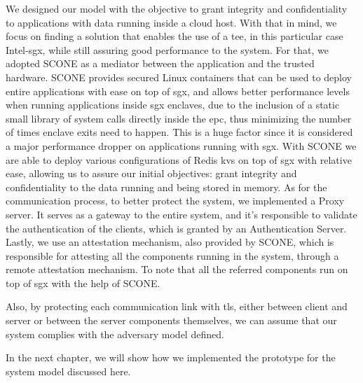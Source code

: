 We designed our model with the objective to grant integrity and confidentiality to applications with data running inside a cloud host. With that in mind, we focus on finding a solution that enables the use of a \gls{tee}, in this particular case Intel-\gls{sgx}, while still assuring good performance to the system. 
For that, we adopted SCONE as a mediator between the application and the trusted hardware. SCONE provides secured Linux containers that can be used to deploy entire applications with ease on top of \gls{sgx}, and allows better performance levels when running applications inside \gls{sgx} enclaves, due to the inclusion of a static small library of system calls directly inside the \gls{epc}, thus minimizing the number of times enclave exits need to happen. This is a huge factor since it is considered a major performance dropper on applications running with \gls{sgx}. 
With SCONE we are able to deploy various configurations of Redis \gls{kvs} on top of \gls{sgx} with relative ease, allowing us to assure our initial objectives:  grant integrity and confidentiality to the data running and being stored in memory. 
As for the communication process, to better protect the system, we implemented a Proxy server. It serves as a gateway to the entire system, and it's responsible to validate the authentication of the clients, which is granted by an Authentication Server. Lastly, we use an attestation mechanism, also provided by SCONE, which is responsible for attesting all the components running in the system, through a remote attestation mechanism. To note that all the referred components run on top of \gls{sgx} with the help of SCONE. 

Also, by protecting each communication link with \gls{tls}, either between client and server or between the server components themselves, we can assume that our system complies with the adversary model defined.

In the next chapter, we will show how we implemented the prototype for the system model discussed here.

